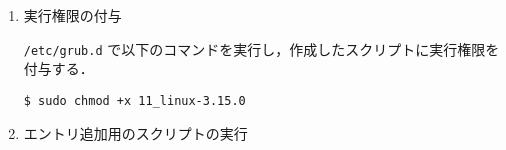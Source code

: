 \documentclass[12pt]{jsarticle}
\begin{document}
\begin{enumerate}
\begin{enumerate}
\begin{spacing}{0.7}
\begin{verbatim}
\end{verbatim}
\end{spacing}
スクリプトに記載された項目について以下に示す．

\begin{enumerate}
\item \verb|menuentry| \verb|<| 表示名 \verb|>|

\verb|<| 表示名 \verb|>| : カーネル選択画面に表示される名前

\item set root=(\verb|<| HDD 番号 \verb|>|,\verb|<| パーティション番号 \verb|>|)

\verb|<| HDD 番号 \verb|>| : カーネルが保存されているHDD の番号

\verb|<| パーティション番号 \verb|>| : HDD の\verb|/boot| が割り当てられたパーティション番号

\item linux \verb|<| カーネルイメージのファイル名 \verb|>|

\verb|<| カーネルイメージのファイル名 \verb|>| : 起動するカーネルのカーネルイメージ

\item ro \verb|<| root デバイス \verb|>|

    \verb|<| root デバイス \verb|>| : 起動時に読み込み専用でマウントするデバイス

\item root=\verb|<| ルートファイルシステム \verb|>| \verb|<| その他のブートオプション \verb|>|

\verb|<| ルートファイルシステム \verb|>| : \verb|/root| を割り当てたパーティション

\verb|<| その他のブートオプション \verb|>| : quiet はカーネルの起動時に出力するメッセージを省略可能

\item initrd \verb|<| 初期RAM ディスク名 \verb|>|

\verb|<| 初期RAM ディスク名 \verb|>| : 起動時にマウントする初期RAM ディスク名

\end{enumerate}

\item 実行権限の付与

\verb|/etc/grub.d| で以下のコマンドを実行し，作成したスクリプトに実行権限を付与する．
\begin{verbatim}
$ sudo chmod +x 11_linux-3.15.0
\end{verbatim}

\item エントリ追加用のスクリプトの実行


\end{enumerate}
\end{enumerate}
\end{document}

